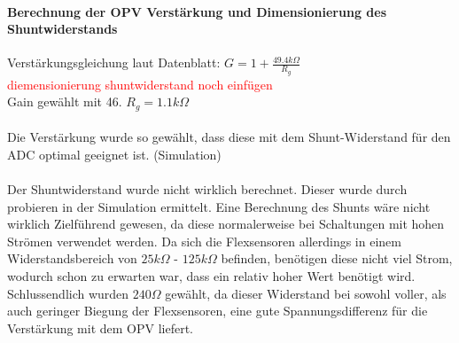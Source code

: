 \documentclass[titlepage,12pt,twoside]{article}
\begin{document}
\paragraph{Berechnung der OPV Verstärkung und Dimensionierung des Shuntwiderstands}
\hfill \break
\hfill \break
\hspace*{1cm} Verstärkungsgleichung laut Datenblatt: $ G = 1+\frac{49.4k\Omega}{R_{g}} $ \\
\textcolor{red}{diemensionierung shuntwiderstand noch einfügen}
\\
\hspace*{1cm} Gain gewählt mit 46. \hspace*{1cm} $ R_{g} = 1.1k\Omega $ \\
\\
Die Verstärkung wurde so gewählt, dass diese mit dem Shunt-Widerstand für den ADC optimal geeignet ist. (Simulation) \\
\\
Der Shuntwiderstand wurde nicht wirklich berechnet. Dieser wurde durch probieren in der Simulation ermittelt. Eine Berechnung
des Shunts wäre nicht wirklich Zielführend gewesen, da diese normalerweise bei Schaltungen mit hohen Strömen verwendet werden. 
Da sich die Flexsensoren allerdings in einem Widerstandsbereich von $25k\Omega$ - $125k\Omega$ befinden, benötigen diese nicht
viel Strom, wodurch schon zu erwarten war, dass ein relativ hoher Wert benötigt wird. Schlussendlich wurden $240\Omega$ gewählt,
da dieser Widerstand bei sowohl voller, als auch geringer Biegung der Flexsensoren, eine gute Spannungsdifferenz für die 
Verstärkung mit dem OPV liefert. \\
\\
\end{document}
